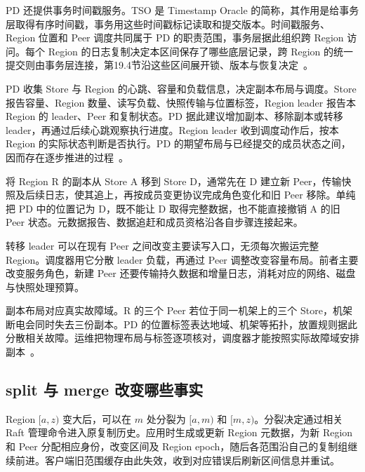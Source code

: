 PD 还提供事务时间戳服务。TSO 是 Timestamp Oracle 的简称，其作用是给事务层取得有序时间戳，事务用这些时间戳标记读取和提交版本。时间戳服务、Region 位置和 Peer 调度共同属于 PD 的职责范围，事务层据此组织跨 Region 访问。每个 Region 的日志复制决定本区间保存了哪些底层记录，跨 Region 的统一提交则由事务层连接，第19.4节沿这些区间展开锁、版本与恢复决定~\cite{tidb-75-pd,tikv-75-transactions}。


PD 收集 Store 与 Region 的心跳、容量和负载信息，决定副本布局与调度。Store 报告容量、Region 数量、读写负载、快照传输与位置标签，Region leader 报告本 Region 的 leader、Peer 和复制状态。PD 据此建议增加副本、移除副本或转移 leader，再通过后续心跳观察执行进度。Region leader 收到调度动作后，按本 Region 的实际状态判断是否执行。PD 的期望布局与已经提交的成员状态之间，因而存在逐步推进的过程~\cite{tikv-75-scheduling}。

将 Region R 的副本从 Store A 移到 Store D，通常先在 D 建立新 Peer，传输快照及后续日志，使其追上，再按成员变更协议完成角色变化和旧 Peer 移除。单纯把 PD 中的位置记为 D，既不能让 D 取得完整数据，也不能直接撤销 A 的旧 Peer 状态。元数据报告、数据追赶和成员资格沿各自步骤连接起来。


转移 leader 可以在现有 Peer 之间改变主要读写入口，无须每次搬运完整 Region。调度器用它分散 leader 负载，再通过 Peer 调整改变容量布局。前者主要改变服务角色，新建 Peer 还要传输持久数据和增量日志，消耗对应的网络、磁盘与快照处理预算。

副本布局对应真实故障域。R 的三个 Peer 若位于同一机架上的三个 Store，机架断电会同时失去三份副本。PD 的位置标签表达地域、机架等拓扑，放置规则据此分散相关故障。运维把物理布局与标签逐项核对，调度器才能按照实际故障域安排副本~\cite{tikv-75-scheduling}。

\subsection*{split 与 merge 改变哪些事实}

Region $[a,z)$ 变大后，可以在 $m$ 处分裂为 $[a,m)$ 和 $[m,z)$。分裂决定通过相关 Raft 管理命令进入原复制历史。应用时生成或更新 Region 元数据，为新 Region 和 Peer 分配相应身份，改变区间及 Region epoch，随后各范围沿自己的复制组继续前进。客户端旧范围缓存由此失效，收到对应错误后刷新区间信息并重试。

